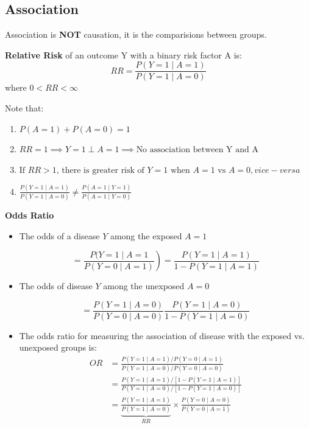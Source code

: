 \subsection{Association}
Association is \textbf{NOT} causation, it is the comparisions between groups.
\begin{definition}
    \textbf{Relative Risk} of an outcome Y with a binary risk factor A is:$$
    RR=\frac{P(Y=1 \mid A=1)}{P(Y=1 \mid A=0)}
    $$
    where $0<RR<\infty$
\end{definition}
Note that:
\begin{enumerate}
    \item $P(A=1)+P(A=0)=1$
    \item $RR=1\implies Y=1 \perp A=1\implies\text{No association between Y and A}$
    \item $
    \text {If } RR>1 \text {, there is greater risk of } Y=1 \text { when } A=1 \text { vs } A=0, vice-versa
    $
    \item $\frac{P(Y=1 \mid A=1)}{P(Y=1 \mid A=0)}\neq \frac{P(A=1 \mid Y=1)}{P(A=1 \mid Y=0)}$
\end{enumerate}
\begin{definition}
    \textbf{Odds Ratio}\par
    \begin{itemize}
        \item The odds of a disease $Y$ among the exposed $A=1$

        $$
        \left.=\frac{P(Y=1 \mid A=1}{P(Y=0 \mid A=1)}\right)=\frac{P(Y=1 \mid A=1)}{1-P(Y=1 \mid A=1)}
        $$
        
        \item The odds of disease $Y$ among the unexposed $A=0$
        
        $$
        =\frac{P(Y=1 \mid A=0)}{P(Y=0 \mid A=0)} \frac{P(Y=1 \mid A=0)}{1-P(Y=1 \mid A=0)}
        $$
        
        \item The odds ratio for measuring the association of disease with the exposed vs. unexposed groups is:        
        \begin{align*}
            OR & =\frac{P(Y=1 \mid A=1) / P(Y=0 \mid A=1)}{P(Y=1 \mid A=0) / P(Y=0 \mid A=0)}\\
            &=\frac{P(Y=1 \mid A=1) /[1-P(Y=1 \mid A=1)]}{P(Y=1 \mid A=0) /[1-P(Y=1 \mid A=0)]}\\
            &=\underbrace{\frac{P(Y=1 \mid A=1)}{P(Y=1 \mid A=0)}}_{RR}\times\frac{P(Y=0 \mid A=0)}{P(Y=0 \mid A=1)}
        \end{align*}        
    \end{itemize}
\end{definition}

